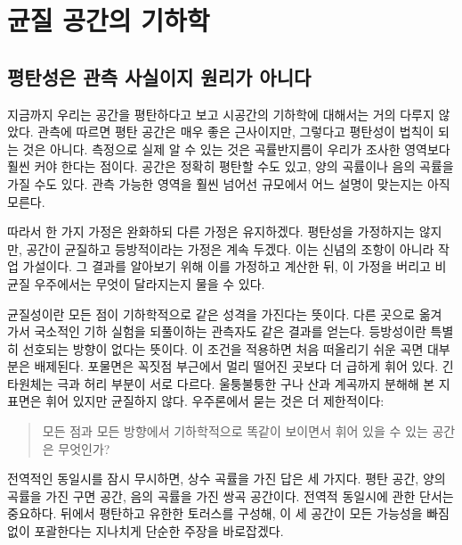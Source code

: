 \chapter{균질 공간의 기하학}


\section{평탄성은 관측 사실이지 원리가 아니다}

지금까지 우리는 공간을 평탄하다고 보고 시공간의 기하학에 대해서는 거의 다루지 않았다. 관측에 따르면 평탄 공간은 매우 좋은 근사이지만, 그렇다고 평탄성이 법칙이 되는 것은 아니다. 측정으로 실제 알 수 있는 것은 곡률반지름이 우리가 조사한 영역보다 훨씬 커야 한다는 점이다. 공간은 정확히 평탄할 수도 있고, 양의 곡률이나 음의 곡률을 가질 수도 있다. 관측 가능한 영역을 훨씬 넘어선 규모에서 어느 설명이 맞는지는 아직 모른다.

따라서 한 가지 가정은 완화하되 다른 가정은 유지하겠다. 평탄성을 가정하지는 않지만, 공간이 균질하고 등방적이라는 가정은 계속 두겠다. 이는 신념의 조항이 아니라 작업 가설이다. 그 결과를 알아보기 위해 이를 가정하고 계산한 뒤, 이 가정을 버리고 비균질 우주에서는 무엇이 달라지는지 물을 수 있다.

균질성이란 모든 점이 기하학적으로 같은 성격을 가진다는 뜻이다. 다른 곳으로 옮겨 가서 국소적인 기하 실험을 되풀이하는 관측자도 같은 결과를 얻는다. 등방성이란 특별히 선호되는 방향이 없다는 뜻이다. 이 조건을 적용하면 처음 떠올리기 쉬운 곡면 대부분은 배제된다. 포물면은 꼭짓점 부근에서 멀리 떨어진 곳보다 더 급하게 휘어 있다. 긴 타원체는 극과 허리 부분이 서로 다르다. 울퉁불퉁한 구나 산과 계곡까지 분해해 본 지표면은 휘어 있지만 균질하지 않다. 우주론에서 묻는 것은 더 제한적이다:
\begin{quote}
모든 점과 모든 방향에서 기하학적으로 똑같이 보이면서 휘어 있을 수 있는 공간은 무엇인가?
\end{quote}

전역적인 동일시를 잠시 무시하면, 상수 곡률을 가진 답은 세 가지다. 평탄 공간, 양의 곡률을 가진 구면 공간, 음의 곡률을 가진 쌍곡 공간이다. 전역적 동일시에 관한 단서는 중요하다. 뒤에서 평탄하고 유한한 토러스를 구성해, 이 세 공간이 모든 가능성을 빠짐없이 포괄한다는 지나치게 단순한 주장을 바로잡겠다.

